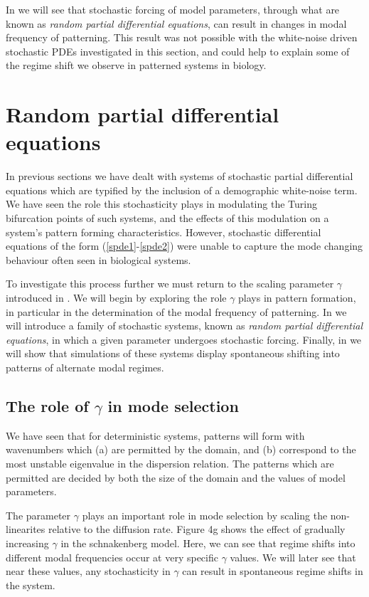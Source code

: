\documentclass[12pt]{article}
\begin{document}
In  we will see that stochastic forcing of model parameters, through what are known as \textit{random partial differential equations}, can result in changes in modal frequency of patterning. This result was not possible with the white-noise driven stochastic PDEs investigated in this section, and could help to explain some of the regime shift we observe in patterned systems in biology.

\section{Random partial differential equations}
In previous sections we have dealt with systems of stochastic partial differential equations which are typified by the inclusion of a demographic white-noise term. We have seen the role this stochasticity plays in modulating the Turing bifurcation points of such systems, and the effects of this modulation on a system's pattern forming characteristics. However, stochastic differential equations of the form (\ref{spde1}-\ref{spde2}) were unable to capture the mode changing behaviour often seen in biological systems. 

To investigate this process further we must return to the scaling parameter $\gamma$ introduced in . We will begin by exploring the role $\gamma$ plays in pattern formation, in particular in the determination of the modal frequency of patterning. In  we will introduce a family of stochastic systems, known as \textit{random partial differential equations}, in which a given parameter undergoes stochastic forcing. Finally, in  we will show that simulations of these systems display spontaneous shifting into patterns of alternate modal regimes.


\subsection{The role of $\gamma$ in mode selection}
We have seen that for deterministic systems, patterns will form with wavenumbers which (a) are permitted by the domain, and (b) correspond to the most unstable eigenvalue in the dispersion relation. The patterns which are permitted are decided by both the size of the domain and the values of model parameters. 

The parameter $\gamma$ plays an important role in mode selection by scaling the non-linearites relative to the diffusion rate. Figure 4g shows the effect of gradually increasing $\gamma$ in the schnakenberg model. Here, we can see that regime shifts into different modal frequencies occur at very specific $\gamma$ values. We will later see that near these values, any stochasticity in $\gamma$ can result in spontaneous regime shifts in the system.
\end{document}

